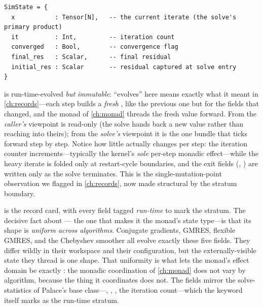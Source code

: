 \begin{lstlisting}[style=l4style]
SimState = {
  x           : Tensor[N],   -- the current iterate (the solve's primary product)
  it          : Int,         -- iteration count
  converged   : Bool,        -- convergence flag
  final_res   : Scalar,      -- final residual
  initial_res : Scalar       -- residual captured at solve entry
}
\end{lstlisting}

 is run-time-evolved \emph{but immutable}: ``evolves'' here means
exactly what it meant in \cref{ch:records}---each step builds a \emph{fresh}
, like the previous one but for the fields that changed, and the
 monad of \cref{ch:monad} threads the fresh value forward. From the
\emph{caller's} viewpoint  is read-only (the solve hands back a
new value rather than reaching into theirs); from the \emph{solve's} viewpoint
it is the one bundle that ticks forward step by step. Notice how little actually
changes per step: the iteration counter  increments---typically the
kernel's \emph{sole} per-step monadic effect---while the heavy iterate 
is folded only at restart-cycle boundaries, and the exit fields
(, ) are written only as the solve terminates.
This is the single-mutation-point observation we flagged in \cref{ch:records},
now made structural by the stratum boundary.

 is the record card, with every field tagged
\emph{run-time} to mark the stratum. The decisive fact about ---
the one that makes it the monad's state type---is that its shape is
\emph{uniform across algorithms}. Conjugate gradients, GMRES, flexible GMRES,
and the Chebyshev smoother all evolve exactly these five fields. They differ
wildly in their workspace and their configuration, but the externally-visible
state they thread is one shape. That uniformity is what lets the 
monad's effect domain be exactly : the monadic coordination of
\cref{ch:monad} does not vary by algorithm, because the thing it coordinates
does not. The fields mirror the  solve-statistics of Palace's base
class---, , , the iteration
count---which the  keyword itself marks as the run-time stratum.

